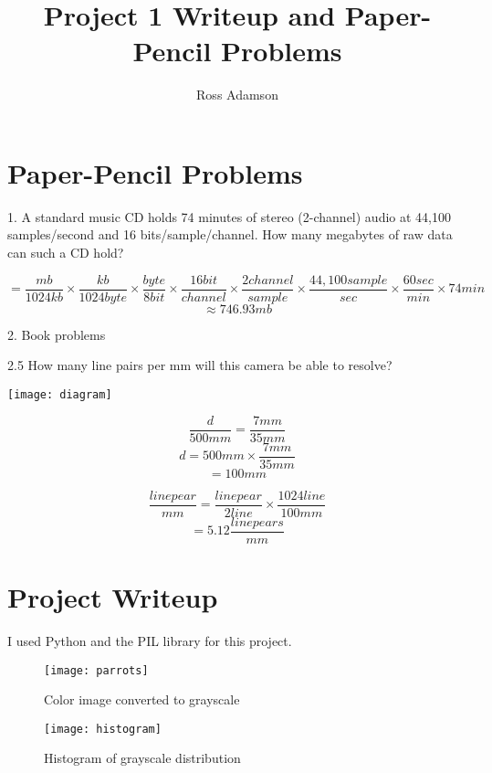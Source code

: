 \documentclass[11pt]{article}  %
\begin{document}

\title{Project 1 Writeup and Paper-Pencil Problems}

\author{Ross Adamson}

\maketitle

\section{Paper-Pencil Problems}

1. A standard music CD holds 74 minutes of stereo (2-channel) audio at 44,100 samples/second and 16 bits/sample/channel. How many megabytes of raw data can such a CD hold?

\[= \frac{mb}{1024kb} \times \frac{kb}{1024byte} \times \frac{byte}{8bit}
\times \frac{16bit}{channel} \times \frac{2channel}{sample}
\times \frac{44,100sample}{sec} \times \frac{60sec}{min}
\times 74min\]
\[\approx 746.93mb\]

2. Book problems

2.5 How many line pairs per mm will this camera be able to resolve?

\texttt{[image: diagram]}

\[\frac{d}{500mm} = \frac{7mm}{35mm}\]
\[d = 500mm \times \frac{7mm}{35mm}\]
\[= 100mm\]

\[\frac{linepear}{mm} = \frac{linepear}{2line}
\times \frac{1024line}{100mm}\]
\[= 5.12 \frac{linepears}{mm}\]

\section{Project Writeup}

I used Python and the PIL library for this project.

\begin{figure}
\centering
\texttt{[image: parrots]}
\caption{Color image converted to grayscale}
\label{grayscale}
\end{figure}

\begin{figure}
\centering
\texttt{[image: histogram]}
\caption{Histogram of grayscale distribution}
\label{histogram}
\end{figure}

\end{document}
